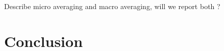 \documentclass{article}
\begin{document}

{\color{red} Describe micro averaging and macro averaging, will we report both ? }

\section{Conclusion}

\clearpage
{}

\end{document}
